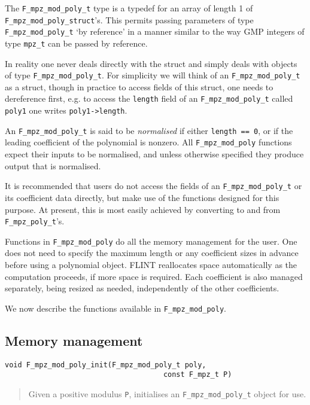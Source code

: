 \documentclass[a4paper,10pt]{article}
\newcommand{\code}{\lstinline}
\begin{document}
The \code{F_mpz_mod_poly_t} type is a typedef for an array of length 1 of \code{F_mpz_mod_poly_struct}'s. 
This permits passing parameters of type \code{F_mpz_mod_poly_t} `by reference' in a manner similar to the 
way GMP integers of type \code{mpz_t} can be passed by reference. 

In reality one never deals directly with the struct and simply deals with objects of type 
\code{F_mpz_mod_poly_t}. For simplicity we will think of an \code{F_mpz_mod_poly_t} as a struct, though 
in practice to access fields of this struct, one needs to dereference first, e.g. to access the 
\code{length} field of an \code{F_mpz_mod_poly_t} called \code{poly1} one writes \code{poly1->length}. 

An \code{F_mpz_mod_poly_t} is said to be \emph{normalised} if either \code{length == 0}, or if the 
leading coefficient of the polynomial is nonzero. All \code{F_mpz_mod_poly} functions expect their inputs 
to be normalised, and unless otherwise specified they produce output that is normalised. 

It is recommended that users do not access the fields of an \code{F_mpz_mod_poly_t} or its coefficient 
data directly, but make use of the functions designed for this purpose. At present, this is most easily
achieved by converting to and from \code{F_mpz_poly_t}'s.

Functions in \code{F_mpz_mod_poly} do all the memory management for the user. One does not need to specify 
the maximum length or any coefficient sizes in advance before using a polynomial object. FLINT 
reallocates space automatically as the computation proceeds, if more space is required. Each coefficient
is also managed separately, being resized as needed, independently of the other coefficients.

We now describe the functions available in \code{F_mpz_mod_poly}.

\subsection{Memory management}

\begin{lstlisting}
void F_mpz_mod_poly_init(F_mpz_mod_poly_t poly, 
                                     const F_mpz_t P)
\end{lstlisting}
\begin{quote}
Given a positive modulus \code{P}, initialises an \code{F_mpz_mod_poly_t} object for use.
\end{quote}
\end{document}
